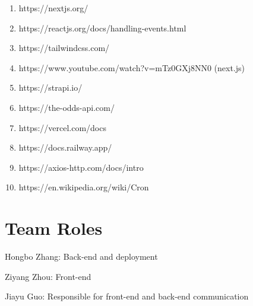 \documentclass[singlecolumn]{article}
\begin{document}
\begin{enumerate}
    \item https://nextjs.org/
    \item https://reactjs.org/docs/handling-events.html
    \item https://tailwindcss.com/
    \item https://www.youtube.com/watch?v=mTz0GXj8NN0 (next.js)
    \item https://strapi.io/
    \item https://the-odds-api.com/
    \item https://vercel.com/docs
    \item https://docs.railway.app/
    \item https://axios-http.com/docs/intro
    \item https://en.wikipedia.org/wiki/Cron
\end{enumerate}







\section{Team Roles}

    Hongbo Zhang: Back-end and deployment

	Ziyang Zhou: Front-end

	Jiayu Guo: Responsible for front-end and back-end communication
\end{document}
